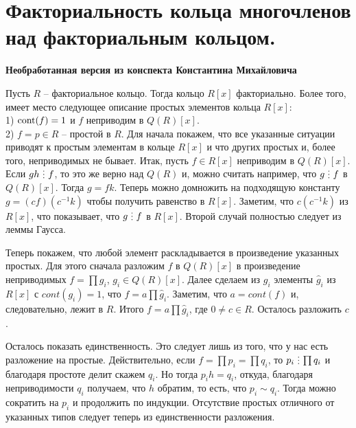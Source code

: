\section{
 Факториальность кольца многочленов над факториальным кольцом.
}

\textbf{Необработанная версия из конспекта Константина Михайловича}


\thrm Пусть $R$ -- факториальное кольцо. Тогда кольцо $R[x]$ факториально. Более того, имеет место следующее описание простых элементов кольца $R[x]$:\\
1)  $\operatorname{cont}(f)=1$ и $f$ неприводим в $Q(R)[x]$.\\
2) $f=p \in R$ -- простой в $R$.
\proof 
Для начала покажем, что все указанные ситуации приводят к простым элементам в кольце $R[x]$ и что других простых и, более того, неприводимых не бывает.
Итак, пусть $f \in R[x]$ неприводим в $Q(R)[x]$. Если $gh\di f$, то это же верно над $Q(R)$ и, можно считать например, что $g\di f$ в $Q(R)[x]$. Тогда $g= fk$. Теперь можно домножить на подходящую константу $g= (cf) (c^{-1}k)$ чтобы получить равенство в $R[x]$. Заметим, что $c(c^{-1}k)$ из $R[x]$, что показывает, что $g \di f$ в $R[x]$. Второй случай полностью следует из леммы Гаусса.


Теперь покажем, что любой элемент раскладывается в произведение указанных простых. Для этого сначала разложим $f$ в $Q(R)[x]$ в произведение неприводимых $f=\prod g_i$, $g_i \in Q(R)[x]$. Далее сделаем из $g_i$ элементы $\hat{g}_i$ из $R[x]$ с $cont(g_i)=1$, что $f=a\prod \hat{g}_i$. Заметим, что $a=cont(f)$ и, следовательно, лежит в $R$. Итого $f=a\prod \hat{g}_i$, где $ 0 \neq c \in R$. Осталось разложить $c$.

Осталось показать единственность. Это следует лишь из того, что у нас есть разложение на простые. Действительно, если $f=\prod p_i=\prod q_i$, то $p_i \di \prod q_i$ и благодаря простоте делит скажем $q_i$. Но тогда $p_ih=q_i$, откуда, благодаря неприводимости $q_i$ получаем, что $h$ обратим, то есть, что $p_i \sim q_i$. Тогда можно сократить на $p_i$ и продолжить по индукции. Отсутствие простых отличного от указанных типов следует теперь из единственности разложения.
\endproof
\ethrm

